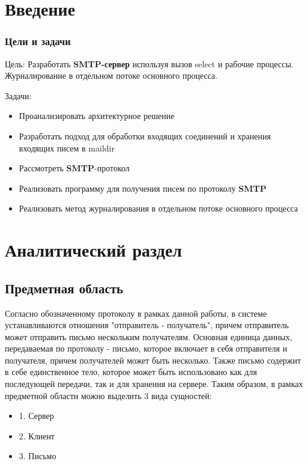 \documentclass[a4paper,12pt]{report}
\begin{document}
\tableofcontents
\setcounter{page}{3} %
\chapter*{Введение}
\subsection{Цели и задачи}

Цель: 
    Разработать \textbf{SMTP-сервер} используя вызов select и рабочие процессы. Журналирование в отдельном потоке основного процесса. 

Задачи:
\begin{itemize}
    \item Проанализировать архитектурное решение
    \item Разработать подход для обработки входящих соединений и хранения входящих писем в maildir
    \item Рассмотреть \textbf{SMTP}-протокол
    \item Реализовать программу для получения писем по протоколу \textbf{SMTP}
    \item Реализовать метод журналирования в отдельном потоке основного процесса
\end{itemize}

\chapter{Аналитический раздел}

\section*{Предметная область}
Согласно обозначенному протоколу в рамках данной работы, в системе устанавливаются отношения "отправитель - получатель", причем отправитель может отправить письмо нескольким получателям. Основная единица данных, передаваемая по протоколу - письмо, которое включает в себя отправителя и получателя, причем получателей может быть несколько. Также письмо содержит в себе единственное тело, которое может быть использовано как для последующей передачи, так и для хранения на сервере.
Таким образом, в рамках предметной области можно выделить 3 вида сущностей:
\begin{itemize}
    \item 1. Сервер
    \item 2. Клиент
    \item 3. Письмо
\end{itemize}
\end{document}
